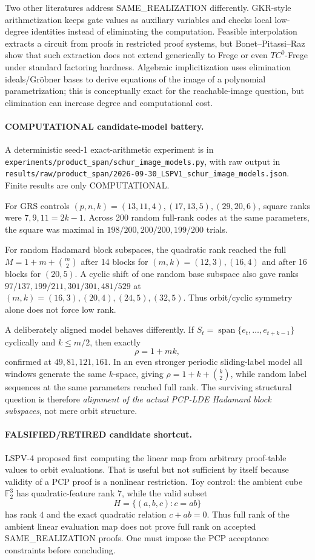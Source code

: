 \documentclass[11pt]{article}
\begin{document}
Two other literatures address SAME\_REALIZATION differently. GKR-style arithmetization keeps gate values as auxiliary variables and checks local low-degree identities instead of eliminating the computation. Feasible interpolation extracts a circuit from proofs in restricted proof systems, but Bonet--Pitassi--Raz show that such extraction does not extend generically to Frege or even $TC^0$-Frege under standard factoring hardness. Algebraic implicitization uses elimination ideals/Gr\"obner bases to derive equations of the image of a polynomial parametrization; this is conceptually exact for the reachable-image question, but elimination can increase degree and computational cost.

\paragraph{COMPUTATIONAL candidate-model battery.}
A deterministic seed-1 exact-arithmetic experiment is in
\texttt{experiments/product\_span/schur\_image\_models.py}, with raw output in
\texttt{results/raw/product\_span/2026-09-30\_LSPV1\_schur\_image\_models.json}.
Finite results are only COMPUTATIONAL.

For GRS controls $(p,n,k)=(13,11,4),(17,13,5),(29,20,6)$, square ranks were
$7,9,11=2k-1$. Across 200 random full-rank codes at the same parameters, the square was maximal in $198/200,200/200,199/200$ trials.

For random Hadamard block subspaces, the quadratic rank reached the full
$M=1+m+\binom m2$ after 14 blocks for $(m,k)=(12,3),(16,4)$ and after 16 blocks for $(20,5)$. A cyclic shift of one random base subspace also gave ranks
$97/137,199/211,301/301,481/529$ at $(m,k)=(16,3),(20,4),(24,5),(32,5)$.
Thus orbit/cyclic symmetry alone does not force low rank.

A deliberately aligned model behaves differently. If
$S_t=\operatorname{span}\{e_t,\ldots,e_{t+k-1}\}$ cyclically and $k\le m/2$, then exactly
\[
\rho=1+mk,
\]
confirmed at $49,81,121,161$. In an even stronger periodic sliding-label model all windows generate the same $k$-space, giving
$\rho=1+k+\binom k2$, while random label sequences at the same parameters reached full rank. The surviving structural question is therefore \emph{alignment of the actual PCP-LDE Hadamard block subspaces}, not mere orbit structure.

\paragraph{FALSIFIED/RETIRED candidate shortcut.}
LSPV-4 proposed first computing the linear map from arbitrary proof-table values to orbit evaluations. That is useful but not sufficient by itself because validity of a PCP proof is a nonlinear restriction. Toy control: the ambient cube $\mathbb F_2^3$ has quadratic-feature rank $7$, while the valid subset
\[
H=\{(a,b,c):c=ab\}
\]
has rank $4$ and the exact quadratic relation $c+ab=0$. Thus full rank of the ambient linear evaluation map does not prove full rank on accepted SAME\_REALIZATION proofs. One must impose the PCP acceptance constraints before concluding.
\end{document}
